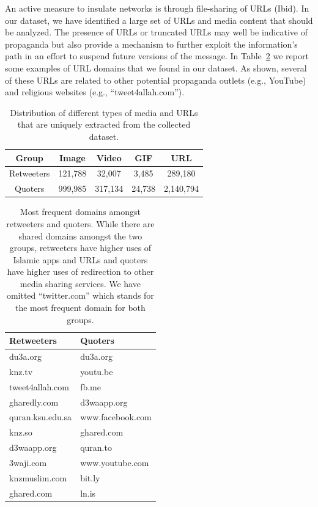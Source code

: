 \documentclass[letterpaper]{article} %
\begin{document}
An active measure to insulate networks is through file-sharing of URLs (Ibid). In our  dataset, we have identified a large set of URLs and media content that should be analyzed. The presence of URLs or truncated URLs may well be indicative of propaganda but also provide a mechanism to further exploit the information's path in an effort to suspend future versions of the message.   In Table~\ref{table:urls} we report some examples of URL domains that we found in our dataset. As shown, several of these URLs are related to other potential propaganda outlets (e.g., YouTube) and religious websites (e.g., ``tweet4allah.com'').  

\begin{table}[!htbp]
\centering
\begin{tabular}{|c||c|c|c|c|} 
 \hline
 Group & Image & Video & GIF & URL \\ [0.5ex] 
 \hline\hline
  \rule{0pt}{1ex} Retweeters & 121,788 & 32,007 & 3,485 & 289,180 \\\hline 
 Quoters & 999,985 & 317,134 & 24,738 & 2,140,794 \\[0.25ex]\hline
\end{tabular}
\caption{Distribution of different types of media and URLs that are uniquely extracted from the collected dataset.}
\label{table:media-types}
\end{table}


\begin{table}[!h]
\centering
\begin{tabular}{|l||l|} 
 \hline
 Retweeters & Quoters \\ [0.5ex] 
 \hline\hline
  du3a.org & du3a.org\\
  knz.tv & youtu.be\\
  tweet4allah.com & fb.me\\
  gharedly.com & d3waapp.org\\
  quran.ksu.edu.sa & www.facebook.com\\
  knz.so & ghared.com\\
  d3waapp.org & quran.to\\
  3waji.com & www.youtube.com\\
  knzmuslim.com & bit.ly\\
  ghared.com & ln.is\\
  [0.25ex]\hline
\end{tabular}
\caption{Most frequent domains amongst retweeters and quoters. While there are shared domains amongst the two groups, retweeters have higher uses of Islamic apps and URLs and quoters have higher uses of redirection to other media sharing services. We have omitted ``twitter.com'' which stands for the most frequent domain for both groups.}
\label{table:urls}
\end{table}
\end{document}
